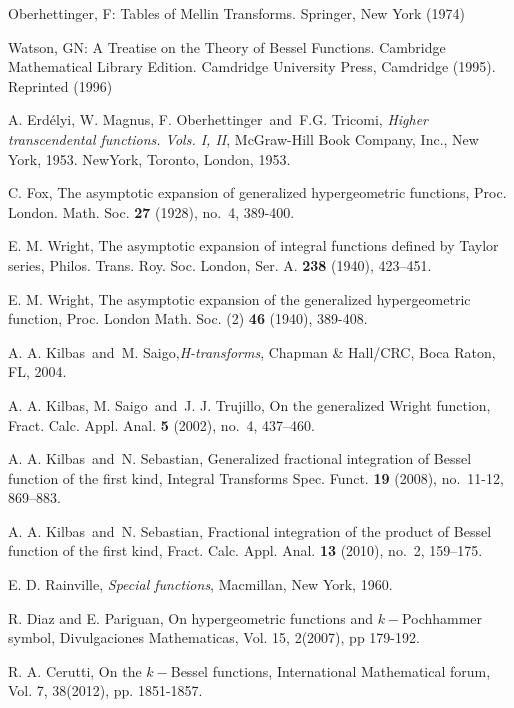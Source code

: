 \documentclass{amsart}
\theoremstyle{plain}
\numberwithin{equation}{section}
\begin{document}
\begin{thebibliography}{99}
 Oberhettinger, F: Tables of Mellin Transforms. Springer, New
York (1974)

 Watson, GN: A Treatise on the Theory of Bessel Functions.
Cambridge Mathematical Library Edition. Camdridge University Press,
Camdridge (1995). Reprinted (1996)

 A. Erd\'{e}lyi, W. Magnus, F. Oberhettinger\ and\ F.G.
Tricomi, \textit{Higher transcendental functions. Vols. I, II}, McGraw-Hill
Book Company, Inc., New York, 1953. NewYork, Toronto, London, 1953.

 C. Fox, The asymptotic expansion of generalized
hypergeometric functions, Proc. London. Math. Soc. \textbf{27} (1928),
no.~4, 389-400.

 E. M. Wright, The asymptotic expansion of integral
functions defined by Taylor series, Philos. Trans. Roy. Soc. London, Ser. A. 
\textbf{238} (1940), 423--451.

 E. M. Wright, The asymptotic expansion of the generalized
hypergeometric function, Proc. London Math. Soc. (2) \textbf{46} (1940),
389-408.

 A. A. Kilbas\ and\ M. Saigo,\textit{H-transforms},
Chapman \& Hall/CRC, Boca Raton, FL, 2004.

 A. A. Kilbas, M. Saigo\ and\ J. J. Trujillo, On the
generalized Wright function, Fract. Calc. Appl. Anal. \textbf{5} (2002),
no.~4, 437--460.

 A. A. Kilbas\ and\ N. Sebastian, Generalized
fractional integration of Bessel function of the first kind, Integral
Transforms Spec. Funct. \textbf{19} (2008), no.~11-12, 869--883.

 A. A. Kilbas\ and\ N. Sebastian, Fractional
integration of the product of Bessel function of the first kind, Fract.
Calc. Appl. Anal. \textbf{13} (2010), no.~2, 159--175.

 E. D. Rainville, \textit{Special functions}, Macmillan,
New York, 1960.

 R. Diaz and E. Pariguan, On hypergeometric functions and $k-$Pochhammer symbol, Divulgaciones Mathematicas, Vol. 15, 2(2007), pp 179-192.

 R. A. Cerutti, On the $k-$Bessel functions, International
Mathematical forum, Vol. 7, 38(2012), pp. 1851-1857.
\end{thebibliography}
\end{document}
